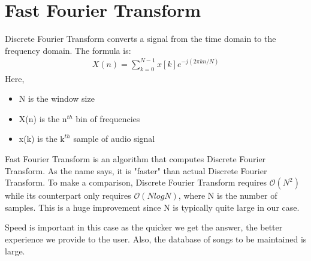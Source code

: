 \documentclass[12pt, a4paper]{IEEEtran}
\begin{document}
\section{Fast Fourier Transform}
Discrete Fourier Transform converts a signal from the time domain to the frequency domain. The formula is:
\begin{align*}
    X(n) = \sum_{k=0}^{N-1} x[k] e^{-j(2\pi kn/N)}
\end{align*}
Here,
\begin{itemize}
    \item N is the window size
    \item X(n) is the \(\text{n}^{th}\) bin of frequencies
    \item x(k) is the \(\text{k}^{th}\) sample of audio signal
\end{itemize}
\par
Fast Fourier Transform is an algorithm that computes Discrete Fourier Transform. As the name says, it is "faster" than actual Discrete Fourier Transform. To make a comparison, Discrete Fourier Transform requires \(\mathcal{O}(N^2)\) while its counterpart only requires \(\mathcal{O}(NlogN)\), where N is the number of samples. This is a huge improvement since N is typically quite large in our case.
\par
Speed is important in this case as the quicker we get the answer, the better experience we provide to the user.
Also, the database of songs to be maintained is large.
\end{document}
